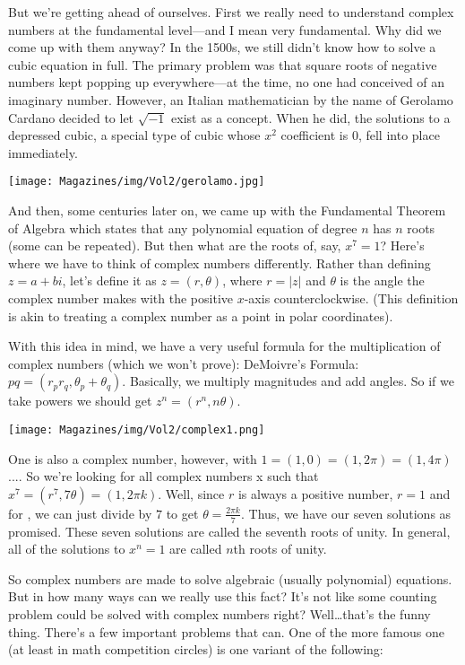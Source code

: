 \documentclass{article}
\begin{document}
\begin{multicols}{3}
But we’re getting ahead of ourselves. First we really need to understand complex numbers at the fundamental level—and I mean very fundamental. Why did we come up with them anyway? In the 1500s, we still didn’t know how to solve a cubic equation in full. The primary problem was that square roots of negative numbers kept popping up everywhere—at the time, no one had conceived of an imaginary number. However, an Italian mathematician by the name of Gerolamo Cardano decided to let $\sqrt{-1}$ exist as a concept. When he did, the solutions to a depressed cubic, a special type of cubic whose $x^2$ coefficient is $0$, fell into place immediately. 
\begin{center}
    \texttt{[image: Magazines/img/Vol2/gerolamo.jpg]}
\end{center}
And then, some centuries later on, we came up with the Fundamental Theorem of Algebra which states that any polynomial equation of degree $n$ has $n$ roots (some can be repeated). But then what are the roots of, say, $x^7=1$? Here’s where we have to think of complex numbers differently. Rather than defining $z=a+bi$, let’s define it as $z=(r,\theta)$, where $r=|z|$ and $\theta$  is the angle the complex number makes with the positive $x$-axis counterclockwise. (This definition is akin to treating a complex number as a point in polar coordinates). 

With this idea in mind, we have a very useful formula for the multiplication of complex numbers (which we won’t prove): DeMoivre’s Formula: $pq=(r_pr_q,\theta_p+\theta_q)$. Basically, we multiply magnitudes and add angles. So if we take powers we should get $z^n=(r^n,n\theta)$. 
\begin{center}
\texttt{[image: Magazines/img/Vol2/complex1.png]}
\end{center}
One is also a complex number, however, with $1=(1,0)=(1,2\pi)=(1,4\pi)$.... So we’re looking for all complex numbers x such that $x^7=(r^7,7\theta)=(1,2\pi k)$. Well, since $r$ is always a positive number, $r=1$ and for , we can just divide by $7$ to get $\theta=\frac{2\pi k}{7}$. Thus, we have our seven solutions as promised. These seven solutions are called the seventh roots of unity. In general, all of the solutions to $x^n=1$ are called $n$th roots of unity. 

So complex numbers are made to solve algebraic (usually polynomial) equations. But in how many ways can we really use this fact? It’s not like some counting problem could be solved with complex numbers right? Well…that’s the funny thing. There’s a few important problems that can. One of the more famous one (at least in math competition circles) is one variant of the following:


\end{multicols}
\end{document}
